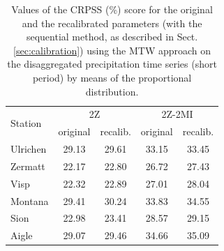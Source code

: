 \documentclass[hess, manuscript]{copernicus}
\begin{document}
\begin{table}[htb]
	\caption{Values of the CRPSS (\%) score for the original and the recalibrated parameters (with the sequential method, as described in Sect. \ref{sec:calibration}) using the MTW approach on the disaggregated precipitation time series (short period) by means of the proportional distribution.}
	\begin{center}
		\begin{tabular}{l c c c c}
			\hline
			\multirow{2}{*}{Station} & \multicolumn{2}{c}{2Z} & \multicolumn{ 2}{c}{2Z-2MI} \\
			& original & recalib. & original & recalib. \\
			\hline
			Ulrichen & 29.13 & 29.61 & 33.15 & 33.45 \\
			Zermatt & 22.17 & 22.80 & 26.72 & 27.43 \\
			Visp & 22.32 & 22.89 & 27.01 & 28.04 \\
			Montana & 29.41 & 30.24 & 33.83 & 34.55 \\
			Sion & 22.98 & 23.41 & 28.57 & 29.15 \\
			Aigle & 29.07 & 29.46 & 34.66 & 35.09 \\
			\hline
		\end{tabular}
	\end{center}
	\label{table:disaggregation_proportional}
\end{table}
\end{document}
